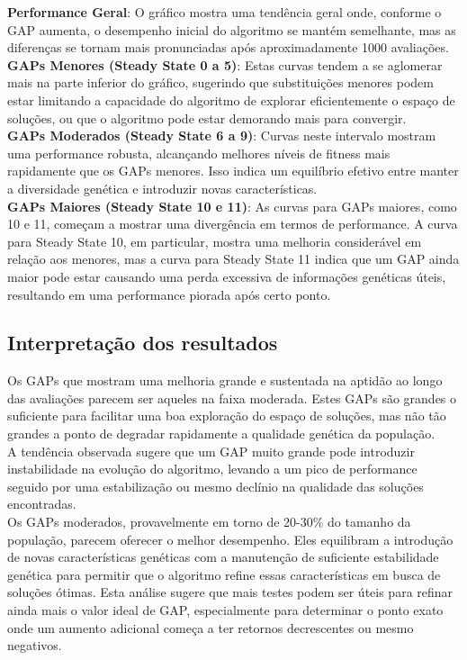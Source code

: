 \documentclass[a4paper, 12pt]{article}
\begin{document}
\textbf{Performance Geral}: O gráfico mostra uma tendência geral onde, conforme o GAP aumenta, o desempenho inicial do algoritmo se mantém semelhante, mas as diferenças se tornam mais pronunciadas após aproximadamente 1000 avaliações.\\

\textbf{GAPs Menores (Steady State 0 a 5)}: Estas curvas tendem a se aglomerar mais na parte inferior do gráfico, sugerindo que substituições menores podem estar limitando a capacidade do algoritmo de explorar eficientemente o espaço de soluções, ou que o algoritmo pode estar demorando mais para convergir.\\

\textbf{GAPs Moderados (Steady State 6 a 9)}: Curvas neste intervalo mostram uma performance robusta, alcançando melhores níveis de fitness mais rapidamente que os GAPs menores. Isso indica um equilíbrio efetivo entre manter a diversidade genética e introduzir novas características.\\

\textbf{GAPs Maiores (Steady State 10 e 11)}: As curvas para GAPs maiores, como 10 e 11, começam a mostrar uma divergência em termos de performance. A curva para Steady State 10, em particular, mostra uma melhoria considerável em relação aos menores, mas a curva para Steady State 11 indica que um GAP ainda maior pode estar causando uma perda excessiva de informações genéticas úteis, resultando em uma performance piorada após certo ponto.\\

\subsection{Interpretação dos resultados}

Os GAPs que mostram uma melhoria grande e sustentada na aptidão ao longo das avaliações parecem ser aqueles na faixa moderada. Estes GAPs são grandes o suficiente para facilitar uma boa exploração do espaço de soluções, mas não tão grandes a ponto de degradar rapidamente a qualidade genética da população.\\

A tendência observada sugere que um GAP muito grande pode introduzir instabilidade na evolução do algoritmo, levando a um pico de performance seguido por uma estabilização ou mesmo declínio na qualidade das soluções encontradas.\\

Os GAPs moderados, provavelmente em torno de 20-30\% do tamanho da população, parecem oferecer o melhor desempenho. Eles equilibram a introdução de novas características genéticas com a manutenção de suficiente estabilidade genética para permitir que o algoritmo refine essas características em busca de soluções ótimas. Esta análise sugere que mais testes podem ser úteis para refinar ainda mais o valor ideal de GAP, especialmente para determinar o ponto exato onde um aumento adicional começa a ter retornos decrescentes ou mesmo negativos.
\end{document}
